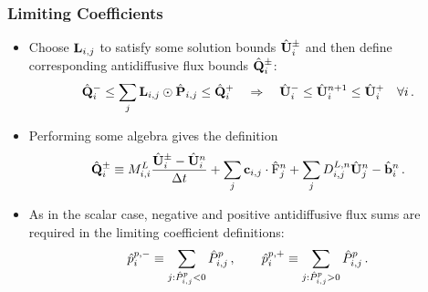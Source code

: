 \begin{frame}
\frametitle{Limiting Coefficients}

\begin{itemize}
  \item Choose $\mathbf{L}_{i,j}$ to satisfy some solution bounds
    $\hat{\mathbf{U}}_{i}^\pm$ and then define corresponding
    antidiffusive flux bounds $\hat{\mathbf{Q}}_i^\pm$:
    \begin{equation}
      \hat{\mathbf{\limitedfluxbound}}^-_i \leq
        \sum\limits_j \limitermatrix\ij\odot\hat{\correctionfluxmatrix}\ij \leq
        \hat{\mathbf{\limitedfluxbound}}^+_i
      \quad\Rightarrow\quad
      \hat{\solutionvector}_i^- \leq
        \hat{\solutionvector}_i^{n+1} \leq
        \hat{\solutionvector}_i^+ \quad \forall i \eqp
    \end{equation}
  \item Performing some algebra gives the definition
    \begin{equation}
      \hat{\mathbf{\limitedfluxbound}}_i^\pm \equiv
        \lumpedmassentry\frac{\hat{\solutionvector}_i^\pm
          -\hat{\solutionvector}_i^n}{\dt}
        + \sum_j\gradiententry\cdot\hat{\consfluxinterpolant}_j^n
        + \sum_j\diffusionmatrixletter\ij^{L,n}\hat{\solutionvector}_j^n
        - \hat{\ssrhs}_i^n \eqp
    \end{equation}
  \item As in the scalar case, negative and positive antidiffusive flux
    sums are required in the limiting coefficient definitions:
    \begin{equation}
      \hat{\correctionfluxletter}_i^{\componentindex,-} \equiv
        \sum\limits_{j:\hat{\correctionfluxentry}\ij^\componentindex<0}
        \hat{\correctionfluxentry}\ij^\componentindex \eqc \qquad
      \hat{\correctionfluxletter}_i^{\componentindex,+} \equiv
        \sum\limits_{j:\hat{\correctionfluxentry}\ij^\componentindex>0}
        \hat{\correctionfluxentry}\ij^\componentindex \eqp
    \end{equation}
\end{itemize}

\end{frame}

